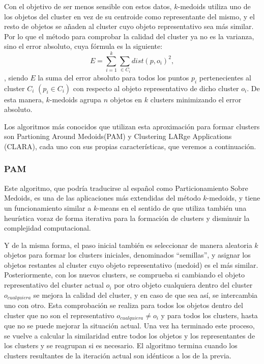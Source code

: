 \documentclass[3p,twocolumn]{elsarticle}
\begin{document}
Con el objetivo de ser menos sensible con estos datos, $k$-medoids utiliza uno de los objetos del cluster en vez de su centroide como representante del mismo, y el resto de objetos se añaden al cluster cuyo objeto representativo sea más similar. Por lo que el método para comprobar la calidad del cluster ya no es la varianza, sino el error absoluto, cuya fórmula es la siguiente: \begin{equation} \label{eq:k-medoids} E =  \sum_{i=1}^{k}  \sum_{ \in C_i} dist(p, o_i)^2 , \end{equation}, siendo $E$ la suma del error absoluto para todos los puntos $p_i$ pertenecientes al cluster $C_i$ $\left(p_i \in C_i \right)$ con respecto al objeto representativo de dicho cluster $o_i$. De esta manera, $k$-medoids agrupa $n$ objetos en $k$ clusters minimizando el error absoluto.

Los algoritmos más conocidos que utilizan esta aproximación para formar clusters son Partioning Around Medoids(PAM) y Clustering LARge Applications (CLARA), cada uno con sus propias características, que veremos a continuación.


\subsubsection{\textbf{PAM}}

Este algoritmo, que podría traducirse al español como Particionamiento Sobre Medoids, es una de las aplicaciones más extendidas del método $k$-medoids, y tiene un funcionamiento similar a $k$-means en el sentido de que utiliza también una heurística voraz de forma iterativa para la formación de clusters y disminuir la complejidad computacional. 

Y de la misma forma, el paso inicial también es seleccionar de manera aleatoria $k$ objetos para formar los clusters iniciales, denominados ``semillas'', y asignar los objetos restantes al cluster cuyo objeto representativo (medoid) es el más similar. Posteriormente, con los nuevos clusters, se comprueba si cambiando el objeto representativo del cluster actual $o_i$ por otro objeto cualquiera dentro del cluster $o_{cualquiera}$ se mejora la calidad del cluster, y en caso de que sea así, se intercambia uno con otro. Esta comprobación se realiza para todos los objetos dentro del cluster que no son el representativo $o_{cualquiera} \neq o_i$ y para todos los clusters, hasta que no se puede mejorar la situación actual. Una vez ha terminado este proceso, se vuelve a calcular la similaridad entre todos los objetos y los representantes de los clusters y se reagrupan si es necesario. El algoritmo termina cuando los clusters resultantes de la iteración actual son idénticos a los de la previa. 
\end{document}
